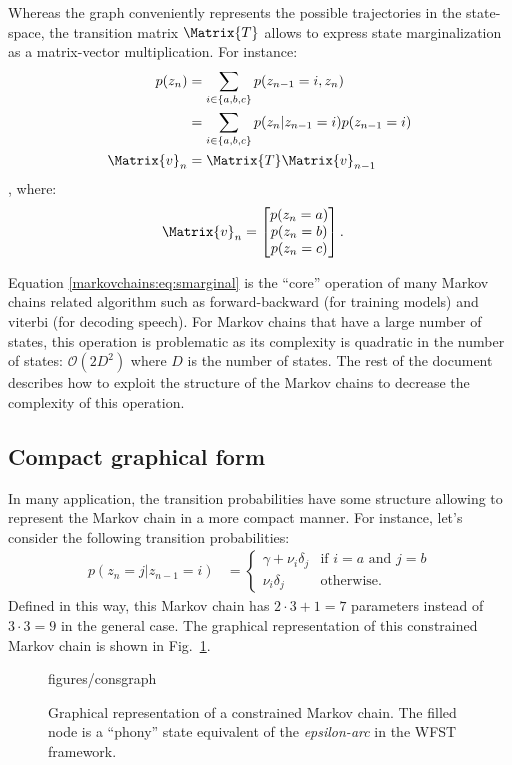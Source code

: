 \documentclass[class=article, crop=false]{standalone}
\begin{document}
Whereas the graph conveniently represents the possible trajectories in
the state-space, the transition matrix $\Matrix{T}$ allows to express
state marginalization as a matrix-vector multiplication. For instance:
\begin{align}
    p(z_n) &= \sum_{i \in \{a, b, c\} } p(z_{n-1}=i, z_n) \\
    &= \sum_{i \in \{a, b, c\}} p(z_n | z_{n-1} = i) p(z_{n-1} = i) \\
    \Matrix{v}_n &= \Matrix{T} \Matrix{v}_{n-1} \label{markovchains:eq:smarginal}
\end{align},
where:
\begin{align}
    \Matrix{v}_n &= \begin{bmatrix}
        p(z_n = a) \\
        p(z_n = b) \\
        p(z_n = c)
\end{bmatrix}.
\end{align}

Equation \eqref{markovchains:eq:smarginal} is the ``core'' operation of many
Markov chains related algorithm such as forward-backward (for training models)
and viterbi (for decoding speech). For Markov chains that have a large number
of states, this operation is problematic as its complexity is quadratic in the
number of states: $\mathcal{O}(2D^2)$ where $D$ is the number of states.
The rest of the document describes how to exploit the structure of the Markov
chains to decrease the complexity of this operation.

\subsection{Compact graphical form}
In many application, the transition probabilities have some structure
allowing to represent the Markov chain in a more compact manner. For
instance, let's consider the following transition probabilities:
\begin{align}
    p(z_n = j | z_{n-1} = i) &= \begin{cases}
        \gamma + \nu_i \delta_j & \text{if } i = a \text{ and } j=b \\
        \nu_i\delta_j & \text{otherwise}.
    \end{cases}
\end{align}
Defined in this way, this Markov chain has $2 \cdot 3 + 1 = 7$
parameters instead of $3 \cdot 3 = 9$ in the general case. The graphical
representation of this constrained Markov chain is shown in
Fig.~\ref{markovchains:fig:consgraph}.
%
\begin{figure}[t]
    \centering
    {figures/consgraph}
    \caption{Graphical representation of a constrained Markov chain.
    The filled node is a ``phony'' state equivalent of the
    \emph{epsilon-arc} in the WFST framework.}
    \label{markovchains:fig:consgraph}
\end{figure}
\end{document}
